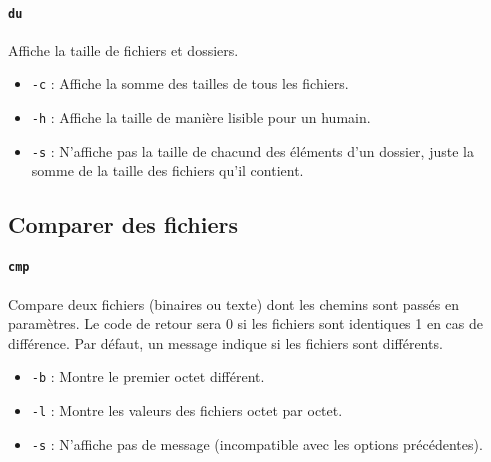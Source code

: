 \paragraph{\texttt{du}} 
Affiche la taille de fichiers et dossiers.
\begin{itemize}
    \item \texttt{-c} : Affiche la somme des tailles de tous les fichiers.
    \item \texttt{-h} : Affiche la taille de manière lisible pour un humain.
    \item \texttt{-s} : N'affiche pas la taille de chacund des éléments d'un dossier, juste la somme de la taille des fichiers qu'il contient.
\end{itemize}

\subsection{Comparer des fichiers}

\paragraph{\texttt{cmp}} 
Compare deux fichiers (binaires ou texte) dont les chemins sont passés en paramètres. Le code de retour sera 0 si les fichiers sont identiques 1 en cas de différence. Par défaut, un message indique si les fichiers sont différents.
\begin{itemize}
    \item \texttt{-b} : Montre le premier octet différent.
    \item \texttt{-l} : Montre les valeurs des fichiers octet par octet.
    \item \texttt{-s} : N'affiche pas de message (incompatible avec les options précédentes).
\end{itemize}

